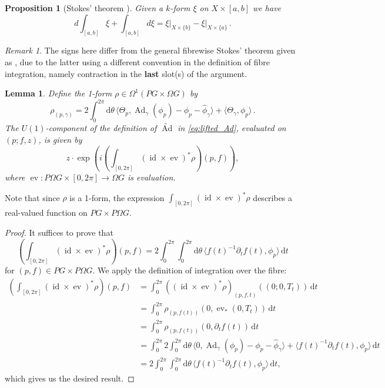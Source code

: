 \documentclass[12pt]{amsart}
\DeclareMathOperator{\id}{id}
\DeclareMathOperator{\Ad}{Ad}
\DeclareMathOperator{\ev}{ev}
\theoremstyle{plain}
\newtheorem{lemma}[theorem]{Lemma}
\newtheorem{proposition}[theorem]{Proposition}
\theoremstyle{definition}
\theoremstyle{remark}
\newtheorem{remark}[theorem]{Remark}
\numberwithin{equation}{section}
\newcommand{\<}{\langle}
\renewcommand{\>}{\rangle}
\newcommand{\intSone}{\int_{0}^{2\pi}\mathrm{d}\theta\,}
\newcommand{\phihat}{\widehat{\phi}}
\begin{document}
\begin{proposition}[Stokes' theorem {\cite[Proposition XI (2), \S 4.10]{GHV}}]\label{prop:stokes}
Given a $k$-form $\xi$ on $X\times [a,b]$ we have 
\[
  d\int_{[a,b]}\xi + \int_{[a,b]}d\xi = \xi\big|_{X\times\{b\}} - \xi\big|_{X\times\{a\}}\,.
\]
\end{proposition}

\begin{remark}
The signs here differ from the general fibrewise Stokes' theorem given as \cite[Problem VII.4(iii)]{GHV}, due to the latter using a different convention in the definition of fibre integration, namely contraction in the \textbf{last} slot(s) of the argument.
\end{remark}

\label{form:xmod form rho}
\begin{lemma}
Define the 1-form $\rho \in \Omega^1(PG\times \Omega G)$ by
      \[
        \rho_{(p,\gamma)} = 2\intSone\langle\Theta_p,\Ad_\gamma(\phi_p)-\phi_p - \phihat_\gamma\rangle + \langle\Theta_\gamma,\phi_p\rangle\,.
      \]
The $U(1)$-component of the definition of $\widetilde{\Ad}$ in \eqref{eq:lifted_Ad}, evaluated on $(p;f,z)$, is given by
\[
   z\cdot \exp\left(i \left(\int_{[0,2\pi]} (\id\times \ev)^*\rho\right)(p,f)\right),
\]
where $\ev\colon P\Omega G\times [0,2\pi]\to \Omega G$ is evaluation. 
\end{lemma}

Note that since $\rho$ is a 1-form, the expression $\int_{[0,2\pi]} (\id\times \ev)^*\rho$ describes a real-valued function on $PG\times P\Omega G$.

\begin{proof}
It suffices to prove that
\[
  \left(\int_{[0,2\pi]} (\id\times \ev)^*\rho\right)(p,f) = 2\int_0^{2\pi}  \intSone \langle f(t)^{-1}\partial_t f(t), \phi_p \rangle\, \mathrm{d}t
\]
for $(p,f)\in PG\times P\Omega G$. We apply the definition of integration over the fibre:
\begin{align*}
  \left(\int_{[0,2\pi]} (\id\times \ev)^*\rho\right)(p,f) 
  & = \int_0^{2\pi}((\id\times \ev)^*\rho)_{(p,f,t)}((0;0,T_t)) \,\mathrm{d}t\\
  & = \int_0^{2\pi}\rho_{(p,f(t))}(0,\ev_*(0,T_t))\, \mathrm{d}t\\
  & = \int_0^{2\pi} \rho_{(p,f(t))}(0,\partial_t f(t))\, \mathrm{d}t\\
  & = \int_0^{2\pi} 2 \intSone \langle 0,\Ad_\gamma(\phi_p)-\phi_p - \phihat_\gamma\rangle+\langle f(t)^{-1}\partial_t f(t),\phi_p\rangle \, \mathrm{d}t\\
  & = 2\int_0^{2\pi} \intSone\langle f(t)^{-1}\partial_t f(t),\phi_p\rangle \, \mathrm{d}t,
\end{align*}
which gives us the desired result.
\end{proof}
\end{document}
